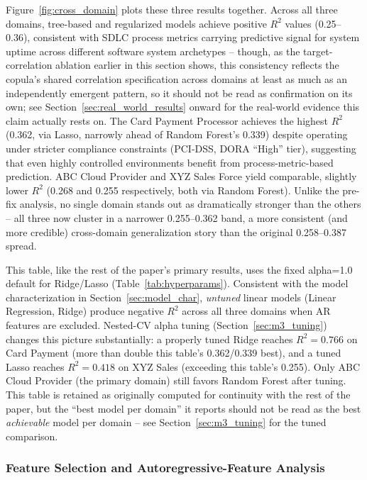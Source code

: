\documentclass[technologies,article,submit,pdftex,moreauthors]{Definitions/mdpi}
\begin{document}
Figure~\ref{fig:cross_domain} plots these three results together.
Across all three domains, tree-based and regularized models achieve
positive \(R^2\) values (0.25--0.36), consistent with SDLC process
metrics carrying predictive signal for system uptime across different
software system archetypes -- though, as the target-correlation ablation
earlier in this section shows, this consistency reflects the copula's
shared correlation specification across domains at least as much as an
independently emergent pattern, so it should not be read as confirmation
on its own; see Section~\ref{sec:real_world_results} onward for the
real-world evidence this claim actually rests on. The Card Payment
Processor achieves the
highest \(R^2\) (0.362, via Lasso, narrowly ahead of Random Forest's
0.339) despite operating under stricter compliance constraints (PCI-DSS,
DORA ``High'' tier), suggesting that even highly controlled environments
benefit from process-metric-based prediction. ABC Cloud Provider and XYZ
Sales Force yield comparable, slightly lower \(R^2\) (0.268 and 0.255
respectively, both via Random Forest). Unlike the pre-fix analysis, no
single domain stands out as dramatically stronger than the others -- all
three now cluster in a narrower 0.255--0.362 band, a more consistent
(and more credible) cross-domain generalization story than the original
0.258--0.387 spread.

This table, like the rest of the paper's primary results, uses the fixed
alpha=1.0 default for Ridge/Lasso (Table~\ref{tab:hyperparams}).
Consistent with the model characterization in Section~\ref{sec:model_char},
\emph{untuned} linear models (Linear Regression, Ridge) produce negative
\(R^2\) across all three domains when AR features are excluded.
Nested-CV alpha tuning (Section~\ref{sec:m3_tuning}) changes this picture
substantially: a properly tuned Ridge reaches \(R^2=0.766\) on Card
Payment (more than double this table's 0.362/0.339 best), and a tuned
Lasso reaches \(R^2=0.418\) on XYZ Sales (exceeding this table's 0.255).
Only ABC Cloud Provider (the primary domain) still favors Random Forest
after tuning. This table is retained as originally computed for
continuity with the rest of the paper, but the ``best model per domain''
it reports should not be read as the best \emph{achievable} model per
domain -- see Section~\ref{sec:m3_tuning} for the tuned comparison.

\subsubsection{Feature Selection and Autoregressive-Feature
Analysis}\label{sec:leakage}
\end{document}
